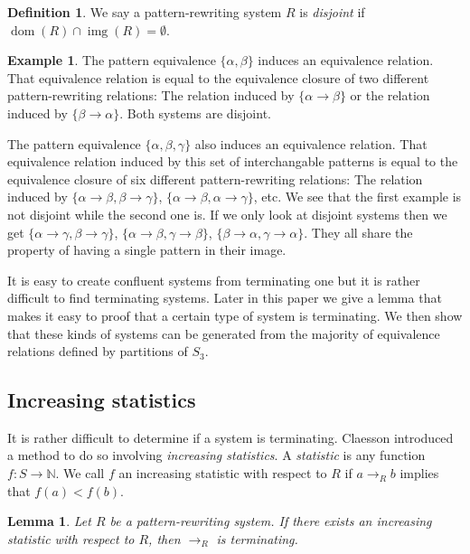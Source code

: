 \documentclass[a4paper, 11pt, english]{article}
\newcommand{\patternrule}{ \to \!}
\newtheorem{lemma}[theorem]{Lemma}
\theoremstyle{definition}
\newtheorem{definition}[theorem]{Definition}
\newtheorem{example}[theorem]{Example}
\newcommand{\Sym}{S}
\DeclareMathOperator{\dom}{dom}
\DeclareMathOperator{\img}{img}
\begin{document}
\begin{definition}
  We say a pattern-rewriting system $R$ is \emph{disjoint} if $\dom(R) \cap \img(R) = \emptyset$.
\end{definition}

\begin{example}
  The pattern equivalence $\{ \alpha, \beta \}$ induces an equivalence relation.
  That equivalence relation is equal to the equivalence closure of two different pattern-rewriting
  relations: The relation induced by $\{ \alpha \patternrule \beta \}$ or the relation induced by
  $\{ \beta \patternrule \alpha \}$. Both systems are disjoint.

  The pattern equivalence $\{ \alpha, \beta, \gamma \}$ also induces an equivalence relation.
  That equivalence relation induced by this set of interchangable patterns is equal to the
  equivalence closure of six different pattern-rewriting
  relations: The relation induced by $\{ \alpha \patternrule \beta, \beta \patternrule \gamma \}$,
  $\{ \alpha \patternrule \beta, \alpha \patternrule \gamma \}$, etc. We see that the first example is
  not disjoint while the second one is. If we only look at disjoint systems then we get
  $\{ \alpha \patternrule \gamma, \beta \patternrule \gamma \}$,
  $\{ \alpha \patternrule \beta, \gamma \patternrule \beta \}$,
  $\{ \beta \patternrule \alpha, \gamma \patternrule \alpha \}$.
  They all share the property of having a single pattern in their image.
\end{example}

It is easy to create confluent systems from terminating one but it is rather difficult to find
terminating systems. Later in this paper we give a lemma that makes it easy to proof that a certain
type of system is terminating. We then show that these kinds of systems can be generated from  the
majority of equivalence relations defined by partitions of $\Sym_3$.

\subsection{Increasing statistics}
It is rather difficult to determine if a system is terminating. Claesson introduced a method to
do so involving \emph{increasing statistics}.
A \emph{statistic} is any function $f : \Sym \to \mathbb{N}$. We call $f$ an increasing
statistic with respect to $R$ if $a \to_R b$ implies that $f(a) < f(b)$.

\begin{lemma}
    Let $R$ be a pattern-rewriting system. If there exists an increasing
    statistic with respect to $R$, then $\to_R$ is terminating.    
\end{lemma}
\end{document}
